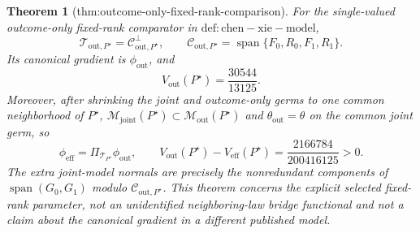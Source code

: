 \documentclass{article}
\newtheorem{theorem}{Theorem}
\begin{document}
\begin{theorem}[thm:outcome-only-fixed-rank-comparison]\label{thm:outcome-only-fixed-rank-comparison}
For the single-valued outcome-only fixed-rank comparator in \(\mathrm{def:chen-xie-model}\),
\[
\mathcal T_{\mathrm{out},P^\star}=\mathcal C_{\mathrm{out},P^\star}^{\perp},
\qquad
\mathcal C_{\mathrm{out},P^\star}
=\operatorname{span}\{F_0,R_0,F_1,R_1\}.
\]
Its canonical gradient is \(\phi_{\mathrm{out}}\), and
\[
V_{\mathrm{out}}(P^\star)=\frac{30544}{13125}.
\]
Moreover, after shrinking the joint and outcome-only germs to one common neighborhood of \(P^\star\), \(\mathcal M_{\mathrm{joint}}(P^\star)\subset\mathcal M_{\mathrm{out}}(P^\star)\) and \(\theta_{\mathrm{out}}=\theta\) on the common joint germ, so
\[
\phi_{\mathrm{eff}}=\Pi_{\mathcal T_{P^\star}}\phi_{\mathrm{out}},
\qquad
V_{\mathrm{out}}(P^\star)-V_{\mathrm{eff}}(P^\star)
=\frac{2166784}{200416125}>0.
\]
The extra joint-model normals are precisely the nonredundant components of \(\operatorname{span}(G_0,G_1)\) modulo \(\mathcal C_{\mathrm{out},P^\star}\). This theorem concerns the explicit selected fixed-rank parameter, not an unidentified neighboring-law bridge functional and not a claim about the canonical gradient in a different published model.
\end{theorem}
\end{document}
